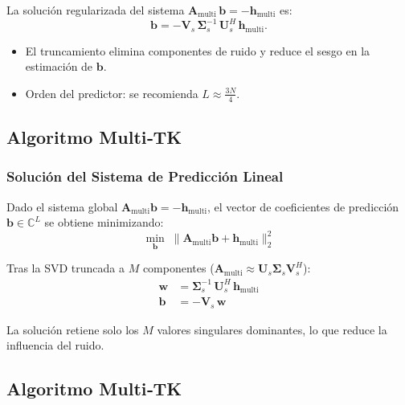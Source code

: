 La solución regularizada del sistema $\mathbf{A}_{\text{multi}}\,\mathbf{b} = -\mathbf{h}_{\text{multi}}$ es:
\begin{equation}
\boxed{\mathbf{b} = -\mathbf{V}_s\,\boldsymbol{\Sigma}_s^{-1}\,\mathbf{U}_s^H\,\mathbf{h}_{\text{multi}}}.
\label{eq:solution}
\end{equation}

\begin{itemize}
\item El truncamiento elimina componentes de ruido y reduce el sesgo en la estimación de $\mathbf{b}$.
\item Orden del predictor: se recomienda $L \approx \tfrac{3N}{4}$.
\end{itemize}


\subsection{Algoritmo Multi‑TK}
\subsubsection{Solución del Sistema de Predicción Lineal}

Dado el sistema global $\mathbf{A}_{\text{multi}}\mathbf{b} = -\mathbf{h}_{\text{multi}}$,
el vector de coeficientes de predicción $\mathbf{b}\in\mathbb{C}^{L}$ se obtiene minimizando:
\begin{equation}
    \min_{\mathbf{b}}\; \|\mathbf{A}_{\text{multi}}\mathbf{b} + \mathbf{h}_{\text{multi}}\|_2^2
    \label{eq:ls}
\end{equation}

Tras la SVD truncada a $M$ componentes ($\mathbf{A}_{\text{multi}} \approx \mathbf{U}_s \boldsymbol{\Sigma}_s \mathbf{V}_s^H$):
\begin{align}
    \mathbf{w} &= \boldsymbol{\Sigma}_s^{-1}\,\mathbf{U}_s^H\,\mathbf{h}_{\text{multi}}
                 \label{eq:weights}\\[4pt]
    \mathbf{b} &= -\mathbf{V}_s\,\mathbf{w}
                 \label{eq:bcoeffs}
\end{align}

La solución retiene solo los $M$ valores singulares dominantes, lo que reduce la influencia del ruido.

\subsection{Algoritmo Multi‑TK}

